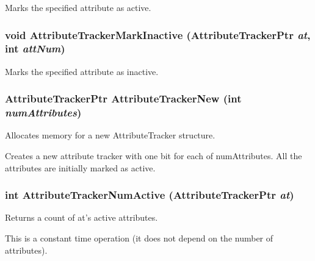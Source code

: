 Marks the specified attribute as active. 

\subsubsection{\setlength{\rightskip}{0pt plus 5cm}void Attribute\-Tracker\-Mark\-Inactive (Attribute\-Tracker\-Ptr {\em at}, int {\em att\-Num})}\label{AttributeTracker_8h_a7}


Marks the specified attribute as inactive. 

\subsubsection{\setlength{\rightskip}{0pt plus 5cm}Attribute\-Tracker\-Ptr Attribute\-Tracker\-New (int {\em num\-Attributes})}\label{AttributeTracker_8h_a2}


Allocates memory for a new Attribute\-Tracker structure. 

Creates a new attribute tracker with one bit for each of num\-Attributes. All the attributes are initially marked as active. 
\subsubsection{\setlength{\rightskip}{0pt plus 5cm}int Attribute\-Tracker\-Num\-Active (Attribute\-Tracker\-Ptr {\em at})}\label{AttributeTracker_8h_a10}


Returns a count of at's active attributes. 

This is a constant time operation (it does not depend on the number of attributes). 